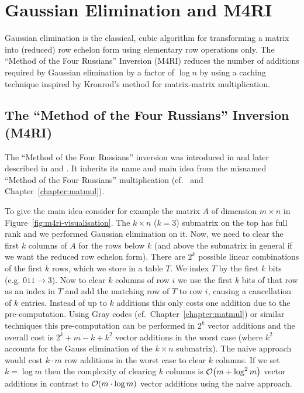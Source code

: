 \section{Gaussian Elimination and M4RI}
\label{sec:gauss}

Gaussian elimination 
is the classical, cubic algorithm for transforming a matrix into (reduced) row echelon form using elementary row operations only.
The ``Method of the Four Russians'' Inversion (M4RI) \cite{bard-m4ri} reduces the number of additions required by Gaussian elimination by a factor of $\log n$ by using a caching technique inspired by Kronrod's method for matrix-matrix multiplication.

\subsection{The ``Method of the Four Russians'' Inversion (M4RI)}
The ``Method of the Four Russians'' inversion was introduced in \cite{Bard2006} and later described in \cite{bard-phd} and \cite{bard-m4ri}. It inherits its name and main idea from the misnamed ``Method of the Four Russians'' multiplication (cf.\  \cite{ADKF70,AHU74} and Chapter~\ref{chapter:matmul}).

To give the main idea consider for example the matrix $A$ of dimension $m \times n$ in Figure~\ref{fig:m4ri-visualisation}. The $k \times n$ ($k=3$) submatrix on the top has full rank and we performed Gaussian elimination on it. Now, we need to clear the first $k$ columns of $A$ for the rows below $k$ (and above the submatrix in general if we want the reduced row echelon form). There are $2^k$ possible linear combinations of the first $k$ rows, which we store in a table $T$. We index $T$ by the first $k$ bits (e.g. $0 1 1 \rightarrow 3$). Now to clear $k$ columns of row $i$ we use the first $k$ bits of that row as an index in $T$ and add the matching row of $T$ to row $i$, causing a cancellation of $k$ entries. Instead of up to $k$ additions this only costs one addition due to the pre-computation. Using Gray codes (cf.\ Chapter~\ref{chapter:matmul}) or similar techniques this pre-computation can be performed in $2^k$ vector additions and the overall cost is $2^k + m - k + k^2$ vector additions in the worst case (where $k^2$ accounts for the Gauss elimination of the $k \times n$ submatrix). The naive approach would cost $k \cdot m$ row additions in the worst case to clear $k$ columns. If we set $k = \log m$ then the complexity of clearing $k$ columns is $\mathcal{O}\!\left(m + \log^2 m\right)$ vector additions in contrast to $\mathcal{O}\!\left(m \cdot \log m\right)$ vector additions using the naive approach.

